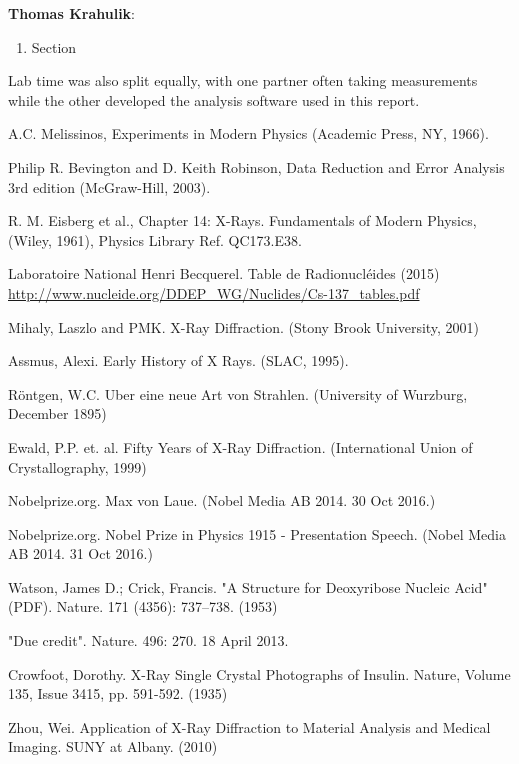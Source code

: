 \documentclass[%
 reprint,
 amsmath,amssymb,
 aps,
 pra,
]{revtex4-1}
\begin{document}
\noindent \textbf{Thomas Krahulik}:
\begin{enumerate}
	\item Section 
\end{enumerate}

\noindent Lab time was also split equally, with one partner often taking measurements while the other developed the analysis software used in this report.

\begin{thebibliography}{6}
	
	A.C. Melissinos, Experiments in Modern Physics (Academic Press, NY, 1966).
	
	Philip R. Bevington and D. Keith Robinson, Data Reduction and Error Analysis 3rd edition (McGraw-Hill, 2003).
	
	R. M. Eisberg et al., Chapter 14: X-Rays. Fundamentals of Modern Physics,  (Wiley, 1961), Physics Library Ref. QC173.E38.

	Laboratoire National Henri Becquerel. Table de Radionucléides (2015) \url{http://www.nucleide.org/DDEP_WG/Nuclides/Cs-137_tables.pdf}
	
	Mihaly, Laszlo and PMK. X-Ray Diffraction. (Stony Brook University, 2001)
	
	Assmus, Alexi. Early History of X Rays. (SLAC, 1995).
	
	R\"{o}ntgen, W.C. Uber eine neue Art von Strahlen. (University of Wurzburg, December 1895)
	
	Ewald, P.P. et. al. Fifty Years of X-Ray Diffraction. (International Union of Crystallography, 1999)
	
	Nobelprize.org. Max von Laue.  (Nobel Media AB 2014. 30 Oct 2016.)
	
	Nobelprize.org. Nobel Prize in Physics 1915 - Presentation Speech. (Nobel Media AB 2014. 31 Oct 2016.)
	
	Watson, James D.; Crick, Francis. "A Structure for Deoxyribose Nucleic Acid" (PDF). Nature. 171 (4356): 737–738. (1953)
	
	 "Due credit". Nature. 496: 270. 18 April 2013.
	 
	 Crowfoot, Dorothy. X-Ray Single Crystal Photographs of Insulin. Nature, Volume 135, Issue 3415, pp. 591-592. (1935)
	 
	 Zhou, Wei. Application of X-Ray Diffraction to Material Analysis and Medical Imaging. SUNY at Albany. (2010)
	 

\end{thebibliography}
\end{document}

